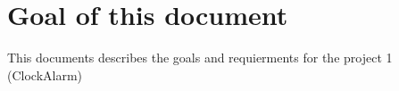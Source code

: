 \chapter{Goal of this document}

This documents describes the goals and requierments for the project 1 (ClockAlarm)